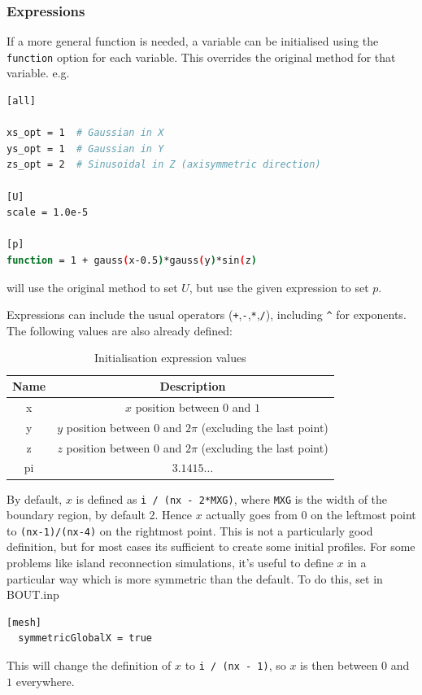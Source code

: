 \documentclass[12pt]{article}
\newcommand{\code}[1]{\texttt{#1}}
\begin{document}
\subsubsection{Expressions}
%
\label{sec:expressions}
%
%
%
%
If a more general function is needed, a variable can be initialised using the
\code{function} option for each variable. This overrides the original method
for that variable. e.g.
%
\begin{lstlisting}[language=bash,numbers=none]
[all]

xs_opt = 1  # Gaussian in X
ys_opt = 1  # Gaussian in Y
zs_opt = 2  # Sinusoidal in Z (axisymmetric direction)

[U]
scale = 1.0e-5

[p]
function = 1 + gauss(x-0.5)*gauss(y)*sin(z)
\end{lstlisting}
%
will use the original method to set $U$, but use the given expression to set
$p$.

Expressions can include the usual operators
(\code{+},\code{-},\code{*},\code{/}), including \code{\^} for exponents. The
following values are also already defined:
%
\begin{table}[htb!]
\centering
\caption{Initialisation expression values}
%
\label{tab:initexprvals}
%
\begin{tabular}{c | c }
\hline
Name & Description \\
\hline
x & $x$ position between $0$ and $1$ \\
y & $y$ position between $0$ and $2\pi$ (excluding the last point)\\
z & $z$ position between $0$ and $2\pi$ (excluding the last point)\\
pi & $3.1415\ldots$\\
\hline
\end{tabular}
%
\end{table}
%
By default, $x$ is defined as \code{i / (nx - 2*MXG)}, where \code{MXG} is the
width of the boundary region, by default 2. Hence $x$ actually goes from 0 on
the leftmost point to \code{(nx-1)/(nx-4)} on the rightmost point. This is not
a particularly good definition, but for most cases its sufficient to create
some initial profiles.
%
%
For some problems like island reconnection simulations, it's useful to define
$x$ in a particular way which is more symmetric than the default. To do this,
set in BOUT.inp
%
\begin{lstlisting}[language=bash,numbers=none]
  [mesh]
  symmetricGlobalX = true
\end{lstlisting}
%
This will change the definition of $x$ to \code{i / (nx - 1)}, so $x$ is then
between $0$ and $1$ everywhere.
\end{document}

